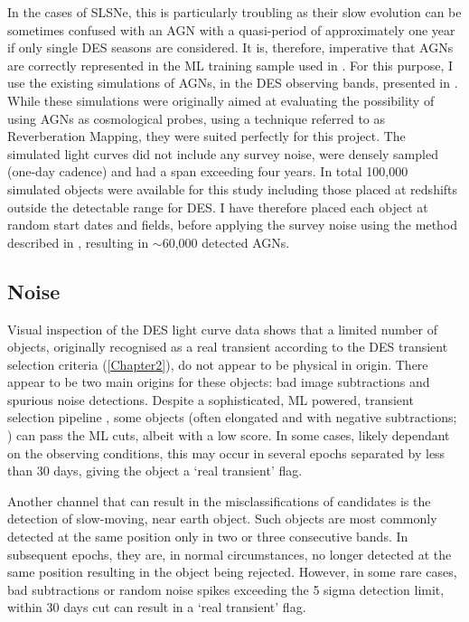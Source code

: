 In the cases of SLSNe, this is particularly troubling as their slow evolution can be sometimes confused with an AGN with a quasi-period of approximately one year if only single DES seasons are considered. It is, therefore, imperative that AGNs are correctly represented in the ML training sample used in . For this purpose, I use the existing simulations of AGNs, in the DES observing bands, presented in \citet{Honig2016}. While these simulations were originally aimed at evaluating the possibility of using AGNs as cosmological probes, using a technique referred to as Reverberation Mapping, they were suited perfectly for this project. The simulated light curves did not include any survey noise, were densely sampled (one-day cadence) and had a span exceeding four years. In total 100,000 simulated objects were available for this study including those placed at redshifts outside the detectable range for DES. I have therefore placed each object at random start dates and fields, before applying the survey noise using the method described in , resulting in $\sim$60,000 detected AGNs.

\subsection{Noise}
Visual inspection of the DES light curve data shows that a limited number of objects, originally recognised as a real transient according to the DES transient selection criteria (\cref{Chapter2}), do not appear to be physical in origin. There appear to be two main origins for these objects: bad image subtractions and spurious noise detections. Despite a sophisticated, ML powered, transient selection pipeline \citep{Goldstein2015}, some objects (often elongated and with negative subtractions; ) can pass the ML cuts, albeit with a low score. In some cases, likely dependant on the observing conditions, this may occur in several epochs separated by less than 30 days, giving the object a `real transient' flag.

Another channel that can result in the misclassifications of candidates is the detection of slow-moving, near earth object. Such objects are most commonly detected at the same position only in two or three consecutive bands. In subsequent epochs, they are, in normal circumstances, no longer detected at the same position resulting in the object being rejected. However, in some rare cases, bad subtractions or random noise spikes exceeding the 5 sigma detection limit, within 30 days cut can result in a `real transient' flag.

